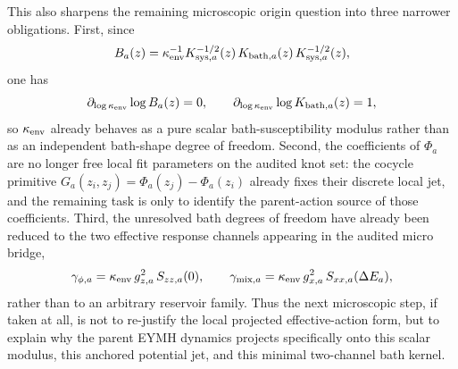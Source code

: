 \documentclass[aps,prd,onecolumn,notitlepage,nofootinbib,superscriptaddress,11pt,floatfix]{revtex4-2}
\begin{document}
This also sharpens the remaining microscopic origin question into three narrower obligations. First, since
\[
B_a(z)=\kappa_{\rm env}^{-1}K_{{\rm sys},a}^{-1/2}(z)\,K_{{\rm bath},a}(z)\,K_{{\rm sys},a}^{-1/2}(z),
\]
one has
\[
\partial_{\log \kappa_{\rm env}}\log B_a(z)=0,
\qquad
\partial_{\log \kappa_{\rm env}}\log K_{{\rm bath},a}(z)=1,
\]
so $\kappa_{\rm env}$ already behaves as a pure scalar bath-susceptibility modulus rather than as an independent bath-shape degree of freedom. Second, the coefficients of $\Phi_a$ are no longer free local fit parameters on the audited knot set: the cocycle primitive $G_a(z_i,z_j)=\Phi_a(z_j)-\Phi_a(z_i)$ already fixes their discrete local jet, and the remaining task is only to identify the parent-action source of those coefficients. Third, the unresolved bath degrees of freedom have already been reduced to the two effective response channels appearing in the audited micro bridge,
\[
\gamma_{\phi,a}=\kappa_{\rm env}\,g_{z,a}^2\,S_{zz,a}(0),
\qquad
\gamma_{{\rm mix},a}=\kappa_{\rm env}\,g_{x,a}^2\,S_{xx,a}(\Delta E_a),
\]
rather than to an arbitrary reservoir family. Thus the next microscopic step, if taken at all, is not to re-justify the local projected effective-action form, but to explain why the parent EYMH dynamics projects specifically onto this scalar modulus, this anchored potential jet, and this minimal two-channel bath kernel.
\end{document}
